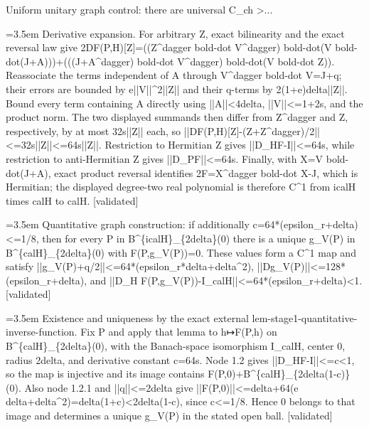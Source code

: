 \documentclass{article}
\newcommand{\step}[1]{\par\noindent\hangindent=3.5em\hangafter=1%
  \makebox[3.5em][l]{\textbf{#1.}}}
\newcommand{\steptag}[1]{\hfill{\small\textsf{[#1]}}}
\begin{document}
\begin{proofbox}{Uniform unitary graph control: there are universal C\_ch >...}
\step{1.2.2} Derivative expansion. For arbitrary Z, exact bilinearity and the exact reversal law give 2DF(P,H)[Z]=((Z\textasciicircum{}dagger bold-dot V\textasciicircum{}dagger) bold-dot(V bold-dot(J+A)))+(((J+A\textasciicircum{}dagger) bold-dot V\textasciicircum{}dagger) bold-dot(V bold-dot Z)). Reassociate the terms independent of A through V\textasciicircum{}dagger bold-dot V=J+q; their errors are bounded by e||V||\textasciicircum{}2||Z|| and their q-terms by 2(1+e)delta||Z||. Bound every term containing A directly using ||A||<4delta, ||V||<=1+2s, and the product norm. The two displayed summands then differ from Z\textasciicircum{}dagger and Z, respectively, by at most 32s||Z|| each, so ||DF(P,H)[Z]-(Z+Z\textasciicircum{}dagger)/2||<=32s||Z||<=64s||Z||. Restriction to Hermitian Z gives ||D\_HF-I||<=64s, while restriction to anti-Hermitian Z gives ||D\_PF||<=64s. Finally, with X=V bold-dot(J+A), exact product reversal identifies 2F=X\textasciicircum{}dagger bold-dot X-J, which is Hermitian; the displayed degree-two real polynomial is therefore C\textasciicircum{}1 from icalH times calH to calH. \steptag{validated} \\[4pt]
\step{1.3} Quantitative graph construction: if additionally c=64*(epsilon\_r+delta)<=1/8, then for every P in B\textasciicircum{}\{icalH\}\_\{2delta\}(0) there is a unique g\_V(P) in B\textasciicircum{}\{calH\}\_\{2delta\}(0) with F(P,g\_V(P))=0. These values form a C\textasciicircum{}1 map and satisfy ||g\_V(P)+q/2||<=64*(epsilon\_r*delta+delta\textasciicircum{}2), ||Dg\_V(P)||<=128*(epsilon\_r+delta), and ||D\_H F(P,g\_V(P))-I\_calH||<=64*(epsilon\_r+delta)<1. \steptag{validated} \\[6pt]
\step{1.3.1} Existence and uniqueness by the exact external lem-stage1-quantitative-inverse-function. Fix P and apply that lemma to h↦F(P,h) on B\textasciicircum{}\{calH\}\_\{2delta\}(0), with the Banach-space isomorphism I\_calH, center 0, radius 2delta, and derivative constant c=64s. Node 1.2 gives ||D\_HF-I||<=c<1, so the map is injective and its image contains F(P,0)+B\textasciicircum{}\{calH\}\_\{2delta(1-c)\}(0). Also node 1.2.1 and ||q||<=2delta give ||F(P,0)||<=delta+64(e delta+delta\textasciicircum{}2)=delta(1+c)<2delta(1-c), since c<=1/8. Hence 0 belongs to that image and determines a unique g\_V(P) in the stated open ball. \steptag{validated} \\[4pt]

\end{proofbox}
\end{document}
